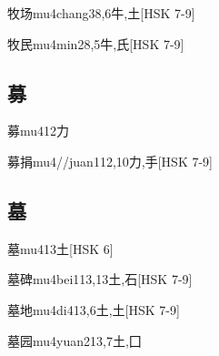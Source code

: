 \begin{EntryWithPhonetic}{牧场}{mu4chang3}{8,6}{⽜,⼟}[HSK 7-9]
\end{EntryWithPhonetic}

\begin{EntryWithPhonetic}{牧民}{mu4min2}{8,5}{⽜,⽒}[HSK 7-9]
\end{EntryWithPhonetic}

\subsection*{募}

\begin{EntryWithPhonetic}{募}{mu4}{12}{⼒}
\end{EntryWithPhonetic}

\begin{EntryWithPhonetic}{募捐}{mu4//juan1}{12,10}{⼒,⼿}[HSK 7-9]
\end{EntryWithPhonetic}

\subsection*{墓}

\begin{EntryWithPhonetic}{墓}{mu4}{13}{⼟}[HSK 6]
\end{EntryWithPhonetic}

\begin{EntryWithPhonetic}{墓碑}{mu4bei1}{13,13}{⼟,⽯}[HSK 7-9]
\end{EntryWithPhonetic}

\begin{EntryWithPhonetic}{墓地}{mu4di4}{13,6}{⼟,⼟}[HSK 7-9]
\end{EntryWithPhonetic}

\begin{EntryWithPhonetic}{墓园}{mu4yuan2}{13,7}{⼟,⼞}
\end{EntryWithPhonetic}

